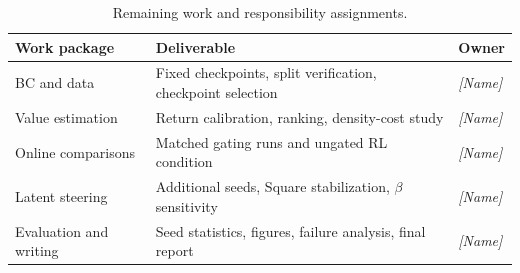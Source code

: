 \documentclass[10pt]{article}
\begin{document}
\begin{table}[t]
  \centering\small
  \caption{Remaining work and responsibility assignments.}
  \label{tab:plan}
  \begin{tabular}{lll}
    \toprule
    Work package & Deliverable & Owner \\
    \midrule
    BC and data            & Fixed checkpoints, split verification, checkpoint selection & \textit{[Name]} \\
    Value estimation       & Return calibration, ranking, density-cost study             & \textit{[Name]} \\
    Online comparisons     & Matched gating runs and ungated RL condition                & \textit{[Name]} \\
    Latent steering        & Additional seeds, Square stabilization, $\beta$ sensitivity & \textit{[Name]} \\
    Evaluation and writing & Seed statistics, figures, failure analysis, final report    & \textit{[Name]} \\
    \bottomrule
  \end{tabular}
\end{table}
\end{document}
